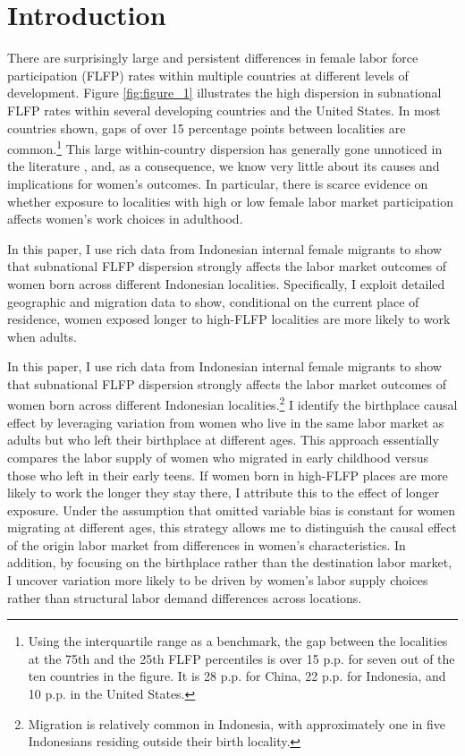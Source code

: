\section{Introduction}

There are surprisingly large and persistent differences in female labor force participation (FLFP) rates within multiple countries at different levels of development. Figure \ref{fig:figure_1} illustrates the high dispersion in subnational FLFP rates within several developing countries and the United States. In most countries shown, gaps of over 15 percentage points between localities are common.\footnote{Using the interquartile range as a benchmark, the gap between the localities at the 75th and the 25th FLFP percentiles is over 15 p.p. for seven out of the ten countries in the figure. It is 28 p.p. for China, 22 p.p. for Indonesia, and 10 p.p. in the United States.} This large within-country dispersion has generally gone unnoticed in the literature \citep{Charles2018}, and, as a consequence, we know very little about its causes and implications for women's outcomes.  In particular, there is scarce evidence on whether exposure to localities with high or low female labor market participation affects women's work choices in adulthood. %

\tftext{}


In this paper, I use rich data from Indonesian internal female migrants to show that subnational FLFP dispersion strongly affects the labor market outcomes of women born across different Indonesian localities. Specifically, I exploit detailed geographic and migration data to show, conditional on the current place of residence,  women exposed longer to high-FLFP localities are more likely to work when adults.

In this paper, I use rich data from Indonesian internal female migrants to show that subnational FLFP dispersion strongly affects the labor market outcomes of women born across different Indonesian localities.\footnote{Migration is relatively common in Indonesia, with approximately one in five Indonesians residing outside their birth locality.} I identify the birthplace causal effect by leveraging variation from women who live in the same labor market as adults but who left their birthplace at different ages. This approach essentially compares the labor supply of women who migrated in early childhood versus those who left in their early teens. If women born in high-FLFP places are more likely to work the longer they stay there, I attribute this to the effect of longer exposure. Under the assumption that omitted variable bias is constant for women migrating at different ages, this strategy allows me to distinguish the causal effect of the origin labor market from differences in women's characteristics.  In addition, by focusing on the birthplace rather than the destination labor market, I uncover variation more likely to be driven by women's labor supply choices rather than structural labor demand differences across locations.


